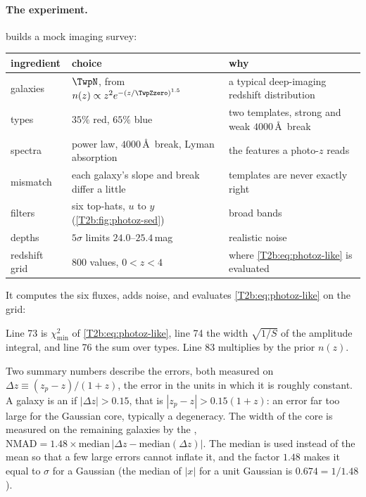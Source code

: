 \paragraph{The experiment.}  builds a mock imaging survey:
\begin{center}
\small
\begin{tabularx}{\linewidth}{@{}l>{\raggedright\arraybackslash}X>{\raggedright\arraybackslash}X@{}}
\toprule
ingredient & choice & why\\
\midrule
galaxies & $\TwpN$, from $n(z)\propto z^2e^{-(z/\TwpZzero)^{1.5}}$ & a typical deep-imaging redshift distribution\\
types & $35\%$ red, $65\%$ blue & two templates, strong and weak $4000$\,\AA\ break\\
spectra & power law, $4000$\,\AA\ break, Lyman absorption & the features a photo-$z$ reads\\
mismatch & each galaxy's slope and break differ a little & templates are never exactly right\\
filters & six top-hats, $u$ to $y$ (\cref{T2b:fig:photoz-sed}) & broad bands\\
depths & $5\sigma$ limits $24.0$--$25.4$\,mag & realistic noise\\
redshift grid & $800$ values, $0<z<4$ & where \eqref{T2b:eq:photoz-like} is evaluated\\
\bottomrule
\end{tabularx}
\end{center}
It computes the six fluxes, adds noise, and evaluates \eqref{T2b:eq:photoz-like} on the grid:


\noindent Line 73 is $\chi^2_{\min}$ of \eqref{T2b:eq:photoz-like}, line 74 the width $\sqrt{1/S}$ of the amplitude integral, and line 76 the sum over types. Line 83 multiplies by the prior $n(z)$.

Two summary numbers describe the errors, both measured on $\Delta z\equiv(z_p-z)/(1+z)$, the error in the units in which it is roughly constant. A galaxy is an  if $|\Delta z|>0.15$, that is $|z_p-z|>0.15(1+z)$: an error far too large for the Gaussian core, typically a degeneracy. The width of the core is measured on the remaining galaxies by the , $\text{NMAD}=1.48\times\text{median}\,\big|\Delta z-\text{median}(\Delta z)\big|$. The median is used instead of the mean so that a few large errors cannot inflate it, and the factor $1.48$ makes it equal to $\sigma$ for a Gaussian (the median of $|x|$ for a unit Gaussian is $0.674=1/1.48$).

